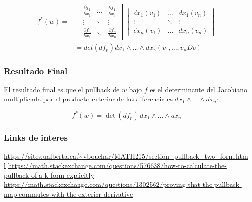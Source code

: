 \documentclass{beamer}
\begin{document}
\begin{frame}
\begin{align*}
f^{*}(w) =& \begin{vmatrix}
\frac{\partial f_{1}}{\partial x_{1}} & \dots & \frac{\partial f_{1}}{\partial x_{j}} \\
\vdots & \ddots & \vdots \\
\frac{\partial f_{n}}{\partial x_{1}} & \ddots & \frac{\partial f_{n}}{\partial x_{n}}
\end{vmatrix} \begin{vmatrix}
dx_{1} (v_1) & \dots & dx_{1} (v_n) \\
\vdots & \ddots & \vdots \\
dx_{n} (v_1) & \dots & dx_{n} (v_n)
\end{vmatrix} \\
&=det(df_{p}) dx_{1} \wedge \dots \wedge dx_{n} (v_1,\dots,v_nDo)
\end{align*}
\end{frame}



\begin{frame}
\frametitle{Resultado Final}
   El resultado final es que el pullback de \( w \) bajo \( f \) es el determinante del Jacobiano multiplicado por el producto exterior de las diferenciales \( dx_{1} \wedge \dots \wedge dx_{n} \):

   \[ f^{*}(w) = \det(df_{p}) \, dx_{1} \wedge \dots \wedge dx_{n} \]
\end{frame}

\begin{frame}
\frametitle{Links de interes}
\url{https://sites.ualberta.ca/~vbouchar/MATH215/section_pullback_two_form.html}
\url{https://math.stackexchange.com/questions/576638/how-to-calculate-the-pullback-of-a-k-form-explicitly}
\url{https://math.stackexchange.com/questions/1302562/proving-that-the-pullback-map-commutes-with-the-exterior-derivative}
\end{frame}
\end{document}
